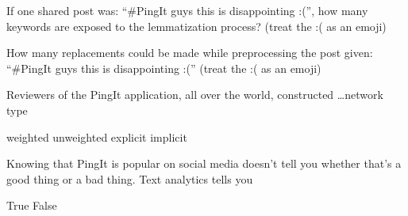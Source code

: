 \documentclass[theme=sleek, randomorder, hidesidemenu]{webquiz}
\begin{document}
\begin{question}
  If one shared post was: ``\#PingIt guys this is disappointing :('', how many keywords are exposed to the lemmatization process? (treat the :( as an emoji)
\end{question}

\begin{question}
  How many replacements could be made while preprocessing the post given:
  ``\#PingIt guys this is disappointing :('' (treat the :( as an emoji)
\end{question}

\begin{question}
  Reviewers of the PingIt application, all over the world, constructed \ldots network type
  \begin{choice}[columns=2]
    \incorrect weighted
    \incorrect unweighted
    \incorrect explicit
    \correct implicit
  \end{choice}
\end{question}

\begin{question}
Knowing that PingIt is popular on social media doesn’t tell you whether that’s
a good thing or a bad thing. Text analytics tells you
\begin{choice}
  \correct True
  \incorrect False
\end{choice}
\end{question}
\end{document}
